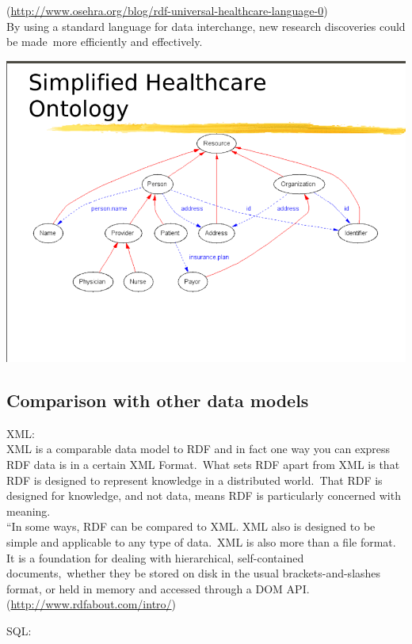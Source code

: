 \documentclass[DIV=calc, paper=a4, fontsize=12pt, onecolumn]{scrartcl}	 %
\begin{document}
 (\url{http://www.osehra.org/blog/rdf-universal-healthcare-language-0})\\

By using a standard language for data interchange, new research discoveries could be made\
more efficiently and effectively.\

\includegraphics[scale=0.4]{rdf1.png}

\subsection{Comparison with other data models}

XML:\\

XML is a comparable data model to RDF and in fact one way you can express RDF data is in a certain XML Format.\
What sets RDF apart from XML is that RDF is designed to represent knowledge in a distributed world.\
That RDF is designed for knowledge, and not data, means RDF is particularly concerned with meaning.\\

“In some ways, RDF can be compared to XML. XML also is designed to be simple and applicable to any type of data.\
XML is also more than a file format. It is a foundation for dealing with hierarchical, self-contained documents,\
 whether they be stored on disk in the usual brackets-and-slashes format, or held in memory and accessed through a DOM API.\\

 (\url{http://www.rdfabout.com/intro/})\

SQL: \\
\end{document}
